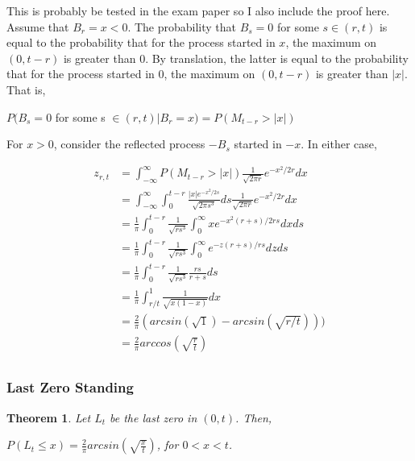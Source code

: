 \documentclass[12pt]{article}
\newtheorem{theorem}{Theorem}
\begin{document}
\noindent This is probably be tested in the exam paper so I also include the proof here.
\\
\noindent Assume that $B_r = x < 0$. The probability that $B_s = 0$ for some $s \in (r,t)$ is equal to the probability that for the process started in $x$, the maximum on $(0, t-r)$ is greater than 0. By translation, the latter is equal to the probability that for the process started in 0, the maximum on $(0, t-r)$ is greater than $|x|$. That is,
\begin{center}
    $P(B_s = 0$ for some s $\in (r,t)|B_r = x) = P(M_{t-r}>|x|)$ 
\end{center}
\noindent For $x > 0$, consider the reflected process $-B_s$ started in $-x$. In either case,
\begin{center}
    \begin{align*}
        z_{r,t} & = \int_{-\infty }^{\infty} P(M_{t-r}>|x|)\frac{1}{\sqrt{2\pi r} }e^{-x^2/2r}dx \\
        & = \int_{-\infty }^{\infty}\int_{0}^{t-r}  \frac{|x|e^{-x^2/2s}}{\sqrt{2\pi s^3}} ds\frac{1}{\sqrt{2\pi r} }e^{-x^2/2r}dx \\
        & = \frac{1}{\pi} \int_{0}^{t-r}  \frac{1}{\sqrt{rs^3}}\int_{0}^{\infty}xe^{-x^2(r+s)/2rs}dxds \\
        & = \frac{1}{\pi} \int_{0}^{t-r}\frac{1}{\sqrt{rs^3}} \int_{0}^{\infty}e^{-z(r+s)/rs}dzds \\
        & = \frac{1}{\pi} \int_{0}^{t-r}\frac{1}{\sqrt{rs^3}}\frac{rs}{r+s}ds \\
        & = \frac{1}{\pi} \int_{r/t}^{1}\frac{1}{\sqrt{x(1-x)}}dx \\
        & = \frac{2}{\pi}(arcsin(\sqrt{1})-arcsin(\sqrt{r/t})))\\
        & = \frac{2}{\pi}arccos(\sqrt{\frac{r}{t}})\\
    \end{align*}
\end{center}

\subsubsection{Last Zero Standing}

\begin{theorem}
Let $L_t$ be the last zero in $(0,t)$. Then,
\begin{center}
    $P(L_t\leq x) = \frac{2}{\pi}arcsin(\sqrt{\frac{x}{t}})$, for $0 < x < t$.
\end{center}
\end{theorem}
\end{document}
